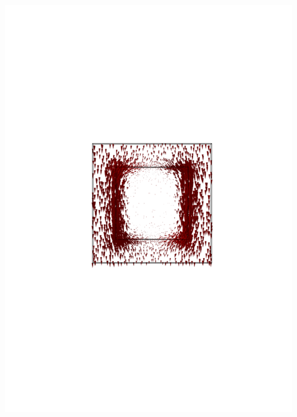 \documentclass[compress]{beamer}
\begin{document}
\begin{frame}
\begin{columns}[totalwidth=\textwidth]
\begin{column}{.35\textwidth}
	\includegraphics[width=0.99\textwidth]{Graphic/04_B3cubemagnefield3MHz_XZview.pdf}
	\end{column}
	\begin{column}{.35\textwidth}
	\centering	

\end{column}
\end{columns}
\end{frame}
\end{document}
